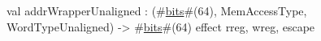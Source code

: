 val addrWrapperUnaligned : (#\hyperref[zbits]{bits}#(64), MemAccessType, WordTypeUnaligned) -> #\hyperref[zbits]{bits}#(64) effect {rreg, wreg, escape}
